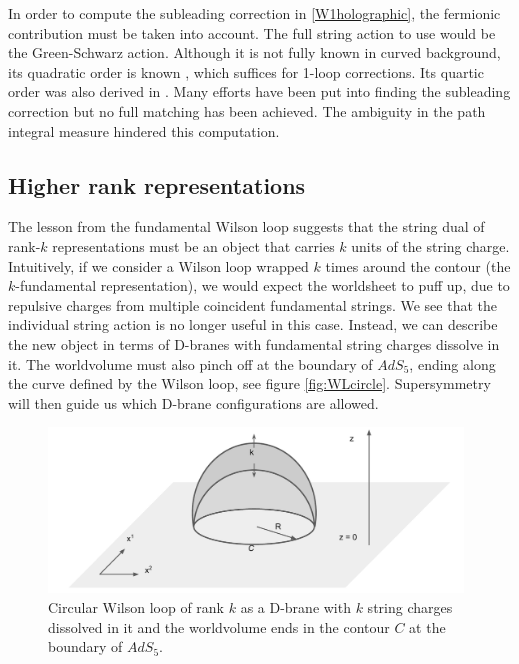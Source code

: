 In order to compute the subleading correction 
in \eqref{W1holographic}, 
the fermionic contribution must be taken into account. 
The full string action to use would be the Green-Schwarz action.
Although it is not fully known in curved background,
its quadratic order is known \cite{Cvetic:1999zs}, which suffices for 1-loop corrections. 
Its quartic order was also derived in \cite{Wulff:2013kga}.
Many efforts have been put into finding the subleading correction  
\cite{Kruczenski:2008zk, Kristjansen:2012nz, Bergamin:2015vxa, Forini:2015bgo, Faraggi:2016ekd, Forini:2017whz}
but no full matching has been achieved.
The ambiguity in the path integral measure hindered this computation.

\subsection{Higher rank representations}

The lesson from the fundamental Wilson loop suggests that 
the string dual of rank-$k$ representations must be an object that carries $k$ units of the string charge.
Intuitively, if we consider a Wilson loop wrapped $k$ times around the contour (the $k$-fundamental representation), 
we would expect the worldsheet to puff up, due to repulsive charges from multiple coincident fundamental strings.
We see that the individual string action is no longer useful in this case. 
Instead, we can describe the new object in terms of D-branes with fundamental string charges dissolve in it. 
The worldvolume must also pinch off at the boundary of $AdS_5$, 
ending along the curve defined by the Wilson loop, see figure \ref{fig:WLcircle}.
Supersymmetry will then guide us which D-brane configurations are allowed.


\begin{figure}[t]
\begin{center}
\includegraphics[width=11cm]{Images/DbraneWL.pdf}
\end{center}
\caption{\label{fig:DbraneWL} Circular Wilson loop of rank $k$ as a D-brane with $k$ string charges dissolved in it and the worldvolume ends in the contour $C$ at the boundary of $AdS_5$. }
\end{figure}


